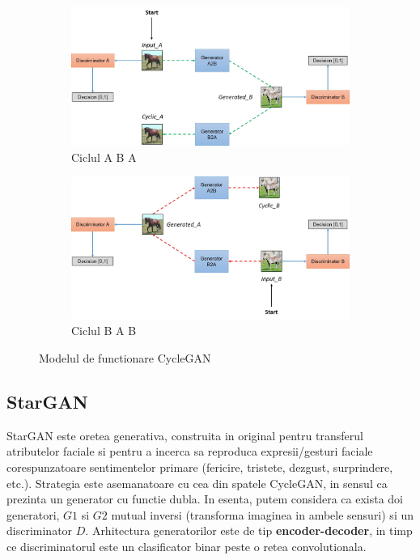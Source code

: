 \documentclass[12pt]{article}
\theoremstyle{definition}
\begin{document}
\begin{figure}[H]
  \centering

	\begin{subfigure}{0.4\textwidth}
	    \centering
		\includegraphics[width=\linewidth]{model.jpg}
		\caption{Ciclul A \Rightarrow B \Rightarrow A}
	\end{subfigure}
	\vspace{1em}
	\begin{subfigure}{0.4\textwidth}
		\centering
		\includegraphics[width=\linewidth]{model1.jpg}
		\caption{Ciclul B \Rightarrow A \Rightarrow B}
	\end{subfigure}

  \caption{Modelul de functionare CycleGAN}
  \label{fig:architecture}
\end{figure}

\subsection{StarGAN}

StarGAN este oretea generativa, construita in original pentru transferul atributelor faciale si pentru a incerca sa reproduca expresii/gesturi faciale corespunzatoare sentimentelor primare (fericire, tristete, dezgust, surprindere, etc.). Strategia este asemanatoare cu cea din spatele CycleGAN, in sensul ca prezinta un generator cu functie dubla. In esenta, putem considera ca exista doi generatori, $G1$ si $G2$ mutual inversi (transforma imaginea in ambele sensuri) si un discriminator $D$. Arhitectura generatorilor este de tip \textbf{encoder-decoder}, in timp ce discriminatorul este un clasificator binar peste o retea convolutionala. 
\end{document}
